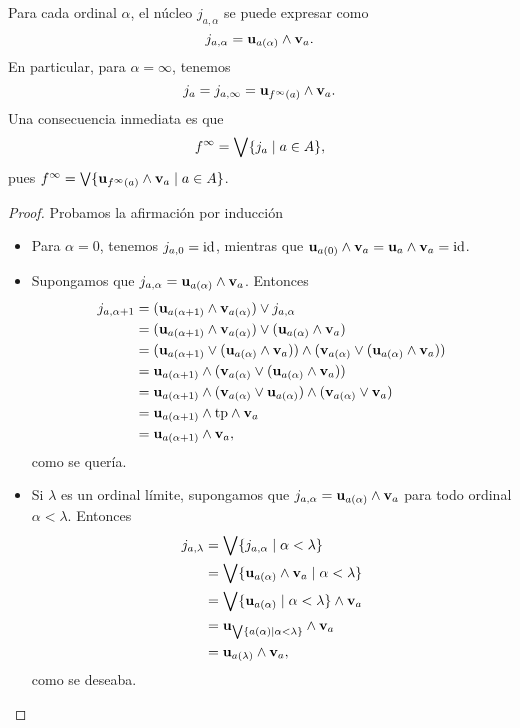 \begin{lemma}
  Para cada ordinal $\alpha$, el núcleo $j_{a,\alpha}$ se puede
  expresar como
  \[
    j_{a,\alpha} = \mathbf u_{a(\alpha)} \wedge \mathbf v_{a}
  .\]
  En particular, para $\alpha=\infty$, tenemos
  \[
    j_a = j_{a,\infty} = \mathbf u_{f^\infty(a)}\wedge\mathbf v_{a}
  .\]
  Una consecuencia inmediata es que
  \[
    f^\infty = \bigvee\{j_a \mid a\in A\}
  ,\]
  pues
  $f^\infty = \bigvee\{\mathbf u_{f^\infty(a)}\wedge\mathbf v_{a} \mid a\in A\}$.
\end{lemma}
\begin{proof}
  Probamos la afirmación por inducción
  \begin{itemize}
    \item Para $\alpha=0$, tenemos $j_{a,0}=\mathrm{id}$, mientras que
    $\mathbf u_{a(0)}\wedge \mathbf v_{a} = \mathbf u_{a} \wedge \mathbf v_{a} = \mathrm{id}$.
    \item Supongamos que
    $j_{a,\alpha} = \mathbf u_{a(\alpha)} \wedge \mathbf v_{a}$.
    Entonces
    \begin{align*}
      j_{a,\alpha+1}
      &= (\mathbf u_{a(\alpha+1)}\wedge \mathbf v_{a(\alpha)})
        \vee j_{a,\alpha} \\
      &= (\mathbf u_{a(\alpha+1)}\wedge \mathbf v_{a(\alpha)})
        \vee (\mathbf u_{a(\alpha)} \wedge \mathbf v_{a}) \\
      &=
      (\mathbf u_{a(\alpha+1)}\vee (\mathbf u_{a(\alpha)} \wedge \mathbf v_{a}))
      \wedge(\mathbf v_{a(\alpha)}\vee (\mathbf u_{a(\alpha)} \wedge \mathbf v_{a})) \\
      &= \mathbf u_{a(\alpha+1)}
      \wedge(\mathbf v_{a(\alpha)}\vee (\mathbf u_{a(\alpha)} \wedge \mathbf v_{a})) \\
      &= \mathbf u_{a(\alpha+1)}
      \wedge(\mathbf v_{a(\alpha)}\vee\mathbf u_{a(\alpha)})
      \wedge(\mathbf v_{a(\alpha)}\vee \mathbf v_{a}) \\
      &= \mathbf u_{a(\alpha+1)} \wedge \mathrm{tp} \wedge \mathbf v_{a} \\
      &= \mathbf u_{a(\alpha+1)}\wedge \mathbf v_{a},
    \end{align*}
    como se quería.
    \item Si $\lambda$ es un ordinal límite, supongamos que 
    $j_{a,\alpha} = \mathbf u_{a(\alpha)} \wedge \mathbf v_{a}$ para todo
    ordinal $\alpha <\lambda$.
    Entonces
    \begin{align*}
      j_{a,\lambda}
      &= \bigvee\{j_{a,\alpha} \mid \alpha<\lambda\} \\
      &= \bigvee\{\mathbf u_{a(\alpha)}\wedge\mathbf v_{a} \mid\alpha<\lambda\}
      \\
      &= \bigvee\{\mathbf u_{a(\alpha)}\mid\alpha<\lambda\}\wedge\mathbf v_{a} \\
      &= \mathbf u_{\bigvee\{a(\alpha)\mid\alpha<\lambda\}}\wedge\mathbf v_{a} \\
      &= \mathbf u_{a(\lambda)}\wedge\mathbf v_{a},
    \end{align*}
    como se deseaba.
  \end{itemize}
\end{proof}


